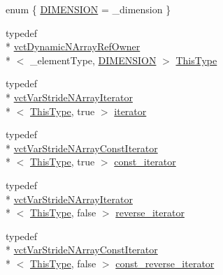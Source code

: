 \begin{DoxyCompactItemize}
\item 
enum \{ \hyperlink{classvct_dynamic_n_array_ref_owner_a80e01cf6b29f06f8909c10a950de8878a189e6a50792859079c88592f0c2ab19b}{D\-I\-M\-E\-N\-S\-I\-O\-N} = \-\_\-dimension
 \}
\item 
typedef \\*
\hyperlink{classvct_dynamic_n_array_ref_owner}{vct\-Dynamic\-N\-Array\-Ref\-Owner}\\*
$<$ \-\_\-element\-Type, \hyperlink{classvct_dynamic_n_array_ref_owner_a80e01cf6b29f06f8909c10a950de8878a189e6a50792859079c88592f0c2ab19b}{D\-I\-M\-E\-N\-S\-I\-O\-N} $>$ \hyperlink{classvct_dynamic_n_array_ref_owner_acd225aa6d3759b053ed4ab7ca6026989}{This\-Type}
\item 
typedef \\*
\hyperlink{classvct_var_stride_n_array_iterator}{vct\-Var\-Stride\-N\-Array\-Iterator}\\*
$<$ \hyperlink{classvct_dynamic_n_array_ref_owner_acd225aa6d3759b053ed4ab7ca6026989}{This\-Type}, true $>$ \hyperlink{classvct_dynamic_n_array_ref_owner_a9d68370074a5320a30354e700207ad71}{iterator}
\item 
typedef \\*
\hyperlink{classvct_var_stride_n_array_const_iterator}{vct\-Var\-Stride\-N\-Array\-Const\-Iterator}\\*
$<$ \hyperlink{classvct_dynamic_n_array_ref_owner_acd225aa6d3759b053ed4ab7ca6026989}{This\-Type}, true $>$ \hyperlink{classvct_dynamic_n_array_ref_owner_ab6652472746656a9be2de178295fd80b}{const\-\_\-iterator}
\item 
typedef \\*
\hyperlink{classvct_var_stride_n_array_iterator}{vct\-Var\-Stride\-N\-Array\-Iterator}\\*
$<$ \hyperlink{classvct_dynamic_n_array_ref_owner_acd225aa6d3759b053ed4ab7ca6026989}{This\-Type}, false $>$ \hyperlink{classvct_dynamic_n_array_ref_owner_aabd87b1efc3a18043c6dac3d8017be59}{reverse\-\_\-iterator}
\item 
typedef \\*
\hyperlink{classvct_var_stride_n_array_const_iterator}{vct\-Var\-Stride\-N\-Array\-Const\-Iterator}\\*
$<$ \hyperlink{classvct_dynamic_n_array_ref_owner_acd225aa6d3759b053ed4ab7ca6026989}{This\-Type}, false $>$ \hyperlink{classvct_dynamic_n_array_ref_owner_ade444e0883b2420a8a113171b6e49bf4}{const\-\_\-reverse\-\_\-iterator}
\end{DoxyCompactItemize}
